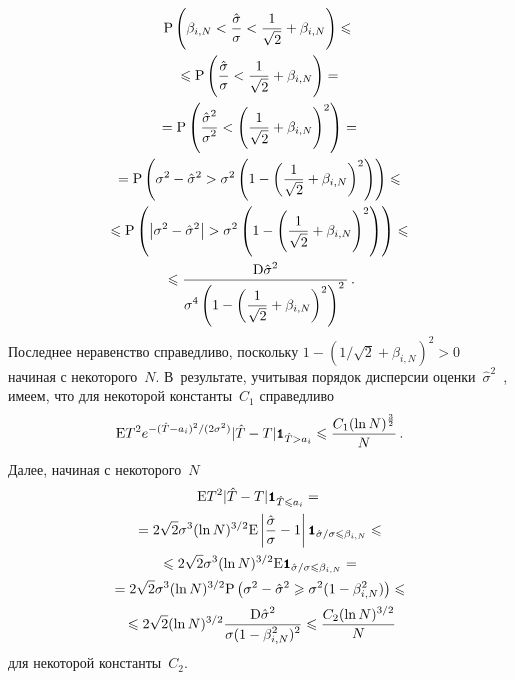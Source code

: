 \begin{multicols}{2}
\noindent
\begin{multline*}
\mbox{P}\left(\beta_{i,N}<\frac{\hat{\sigma}}{\sigma}<\displaystyle\frac{\displaystyle 1\mathstrut}{\displaystyle \sqrt{2}\mathstrut}+\beta_{i,N}\right)\leqslant{}\\
{}\leqslant
\mbox{P}\left(\displaystyle\frac{\displaystyle \hat{\sigma}\mathstrut}{\displaystyle \sigma\mathstrut}<\displaystyle\frac{\displaystyle 1\mathstrut}{\displaystyle \sqrt{2}\mathstrut}+\beta_{i,N}\right)={}\\
{}=\mbox{P}\left(\displaystyle\frac{\displaystyle \hat{\sigma}^2\mathstrut}{\displaystyle \sigma^2\mathstrut}<\left(\displaystyle\frac{\displaystyle 1\mathstrut}{\displaystyle \sqrt{2}\mathstrut}+\beta_{i,N}\right)^2\right)={}\\
{}=\mbox{P}\left(\sigma^2-\hat{\sigma}^2>\sigma^2\left(1-\left(\frac{1}{\sqrt{2}}+\beta_{i,N}\right)^2\right)\right)\leqslant{}\\
{}\leqslant\mbox{P}\left(\left\vert\sigma^2-\hat{\sigma}^2\right\vert>\sigma^2
\left(1-\left(\displaystyle\frac{\displaystyle 1\mathstrut}{\displaystyle \sqrt{2}\mathstrut}+\beta_{i,N}\right)^2\right)\right)\leqslant{}\\
{}\leqslant\displaystyle\frac{\displaystyle \mbox{D}\hat{\sigma}^2\mathstrut}{\displaystyle \sigma^4\left(1-\left(\frac{1}{\sqrt{2}}+\beta_{i,N}\right)^2\right)^2\mathstrut}\,.
\end{multline*}
Последнее неравенство справедливо, поскольку $1-\left({1}/{\sqrt{2}}+\beta_{i,N}\right)^2>0$ начиная с некоторого~$N$.
В~результате, учитывая порядок дисперсии оценки~$\hat{\sigma}^2$~\cite{12she}, 
имеем, что для некоторой константы~$C_1$ справедливо
\begin{equation}
\mbox{E}T^2e^{-{(\hat{T}-a_i)^2}/(2\sigma^2)}|\hat{T}-T|\mbox{{\small \tt {1}}\hspace{-1.5mm}{\tt 1}}_{\hat{T}>a_i}\leqslant\displaystyle\frac{\displaystyle C_1(\ln N)^{\frac{3}{2}}\mathstrut}{\displaystyle N\mathstrut}\,.
\label{e9she}
\end{equation}
Далее, начиная с некоторого~$N$
\begin{multline}
\mbox{E}T^2|\hat{T}-T|\mbox{{\small \tt {1}}\hspace{-1.5mm}{\tt 1}}_{\hat{T}\leqslant a_i}={}\\[1pt]
{}=
2\sqrt{2}\sigma^3(\ln N)^{{3}/{2}}\mbox{E}\left\vert\displaystyle\frac{\displaystyle \hat{\sigma}\mathstrut}{\displaystyle \sigma\mathstrut}-1\right\vert
\mbox{{\small \tt {1}}\hspace{-1.5mm}{\tt 1}}_{{\hat{\sigma}}/\sigma\leqslant\beta_{i,N}}\leqslant{}\\[1pt]
{}\leqslant 2\sqrt{2}\sigma^3(\ln N)^{{3}/{2}}\mbox{E}
\mbox{{\small \tt {1}}\hspace{-1.5mm}{\tt 1}}_{{\hat{\sigma}}/\sigma\leqslant\beta_{i,N}}={}\\[1pt]
{}=2\sqrt{2}\sigma^3(\ln N)^{3/2}\mbox{P}\left(\sigma^2-\hat{\sigma}^2\geqslant\sigma^2(1-\beta^2_{i,N})\right)\leqslant {}\\[1pt]
{}\leqslant
2\sqrt{2}(\ln N)^{3/2}\displaystyle\frac{\displaystyle \mbox{D}\hat{\sigma}^2\mathstrut}{\displaystyle \sigma(1-\beta^2_{i,N})^2\mathstrut}\leqslant
\displaystyle\frac{\displaystyle C_2(\ln N)^{3/2}\mathstrut}{\displaystyle N\mathstrut}
\label{e10she}
\end{multline}
для некоторой константы~$C_2$.
\pagebreak


\end{multicols}
